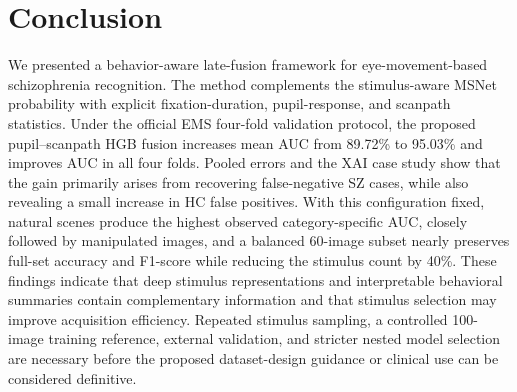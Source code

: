 \documentclass[conference,a4paper]{IEEEtran}
\begin{document}

\section{Conclusion}
We presented a behavior-aware late-fusion framework for eye-movement-based schizophrenia recognition. The method complements the stimulus-aware MSNet probability with explicit fixation-duration, pupil-response, and scanpath statistics. Under the official EMS four-fold validation protocol, the proposed pupil--scanpath HGB fusion increases mean AUC from 89.72\% to 95.03\% and improves AUC in all four folds. Pooled errors and the XAI case study show that the gain primarily arises from recovering false-negative SZ cases, while also revealing a small increase in HC false positives. With this configuration fixed, natural scenes produce the highest observed category-specific AUC, closely followed by manipulated images, and a balanced 60-image subset nearly preserves full-set accuracy and F1-score while reducing the stimulus count by 40\%. These findings indicate that deep stimulus representations and interpretable behavioral summaries contain complementary information and that stimulus selection may improve acquisition efficiency. Repeated stimulus sampling, a controlled 100-image training reference, external validation, and stricter nested model selection are necessary before the proposed dataset-design guidance or clinical use can be considered definitive.



\end{document}
